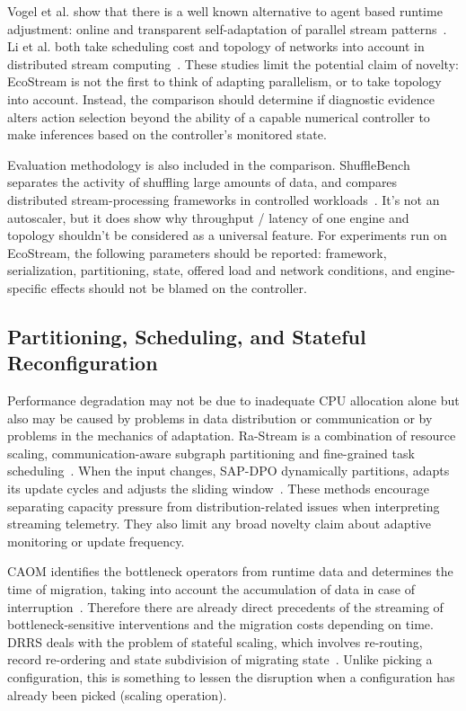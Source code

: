 Vogel et al. show that there is a well known alternative to agent based runtime adjustment: online and transparent self-adaptation of parallel stream patterns~\cite{vogel2023selfadaptation}. Li et al. both take scheduling cost and topology of networks into account in distributed stream computing~\cite{li2026costtopology}. These studies limit the potential claim of novelty: EcoStream is not the first to think of adapting parallelism, or to take topology into account. Instead, the comparison should determine if diagnostic evidence alters action selection beyond the ability of a capable numerical controller to make inferences based on the controller's monitored state.

Evaluation methodology is also included in the comparison. ShuffleBench separates the activity of shuffling large amounts of data, and compares distributed stream-processing frameworks in controlled workloads~\cite{henning2024shufflebench}. It's not an autoscaler, but it does show why throughput / latency of one engine and topology shouldn't be considered as a universal feature. For experiments run on EcoStream, the following parameters should be reported: framework, serialization, partitioning, state, offered load and network conditions, and engine-specific effects should not be blamed on the controller.

\subsection{Partitioning, Scheduling, and Stateful Reconfiguration}
Performance degradation may not be due to inadequate CPU allocation alone but also may be caused by problems in data distribution or communication or by problems in the mechanics of adaptation. Ra-Stream is a combination of resource scaling, communication-aware subgraph partitioning and fine-grained task scheduling~\cite{fan2026rastream}. When the input changes, SAP-DPO dynamically partitions, adapts its update cycles and adjusts the sliding window~\cite{ren2026sapdpo}. These methods encourage separating capacity pressure from distribution-related issues when interpreting streaming telemetry. They also limit any broad novelty claim about adaptive monitoring or update frequency.

CAOM identifies the bottleneck operators from runtime data and determines the time of migration, taking into account the accumulation of data in case of interruption~\cite{tan2025caom}. Therefore there are already direct precedents of the streaming of bottleneck-sensitive interventions and the migration costs depending on time. DRRS deals with the problem of stateful scaling, which involves re-routing, record re-ordering and state subdivision of migrating state~\cite{qing2025drrs}. Unlike picking a configuration, this is something to lessen the disruption when a configuration has already been picked (scaling operation).

